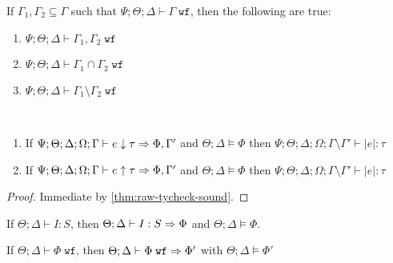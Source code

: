 \begin{theorem}
If $\Gamma_1,\Gamma_2 \subseteq \Gamma$ such that $\Psi ; \Theta ; \Delta \vdash \Gamma \; \texttt{wf}$, then the following are true:
\begin{enumerate}
  \item $\Psi ; \Theta ; \Delta \vdash \Gamma_1,\Gamma_2 \; \texttt{wf}$
  \item $\Psi ; \Theta ; \Delta \vdash \Gamma_1 \cap \Gamma_2 \; \texttt{wf}$
  \item $\Psi ; \Theta ; \Delta \vdash \Gamma_1\setminus\Gamma_2 \; \texttt{wf}$
\end{enumerate}
\end{theorem}

\begin{theorem}
\label{thm:raw-tycheck-sound}
~\begin{enumerate}
 \item If $\Psi;\Theta;\Delta;\Omega;\Gamma \vdash e \downarrow \tau \Rightarrow \Phi, \Gamma'$ and $\Theta;\Delta \vDash \Phi$ then $\Psi;\Theta;\Delta;\Omega;\Gamma \setminus \Gamma' \vdash |e| : \tau$
 \item If $\Psi;\Theta;\Delta;\Omega;\Gamma \vdash e \uparrow \tau \Rightarrow \Phi, \Gamma'$ and $\Theta;\Delta \vDash \Phi$ then $\Psi;\Theta;\Delta;\Omega;\Gamma \setminus \Gamma' \vdash |e| : \tau$
\end{enumerate}
\end{theorem}

\tychecksound*
\begin{proof}
Immediate by \ref{thm:raw-tycheck-sound}.
\end{proof}




\begin{theorem}
If $\Theta;\Delta \vdash I : S$, then $\Theta;\Delta \vdash I : S \Rightarrow \Phi$ and $\Theta;\Delta \vDash \Phi$.
\label{thm:raw-sort-compl}
\end{theorem}

\begin{theorem}
If $\Theta ; \Delta \vdash \Phi \; \texttt{wf}$, then $\Theta ; \Delta \vdash \Phi \; \texttt{wf} \Rightarrow \Phi'$ with $\Theta ; \Delta \vDash \Phi'$
\label{thm:raw-constr-compl}
\end{theorem}

